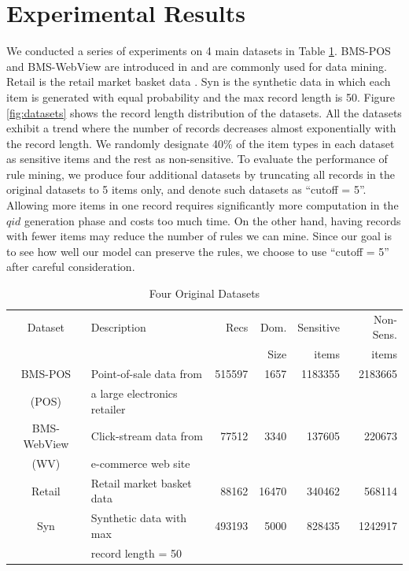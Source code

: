 \section{Experimental Results}
\label{sec:eval}

We conducted a series of experiments on
4 main datasets in Table \ref{tab:datasets}. BMS-POS and BMS-WebView are
introduced in \cite{Zheng:2001:RWP:502512.502572} and are commonly used for
data mining. Retail is the retail market basket data \cite{brijs99:retailData}. Syn is the synthetic data in which each item is generated with
equal probability and the max record length is 50.
%
Figure \ref{fig:datasets} shows the record length distribution of the datasets.
All the datasets exhibit a trend where the number of records decreases almost exponentially
with the record length.
%
We randomly designate 40\% of the item types in each dataset as
sensitive items and the rest as non-sensitive.
%
To evaluate the performance of rule mining,
we produce four additional datasets by truncating all records in the
original datasets to 5 items only, and denote
such datasets as ``cutoff = 5''.
Allowing more items in one record requires significantly more computation in the $qid$ 
generation phase and costs too much time. On the other hand,
having records with fewer items may reduce the number of rules we can mine.
Since our goal is to see how well our model can preserve the rules, 
we choose to use ``cutoff = 5'' after careful consideration.

\begin{table}[tb]
\centering
\caption{Four Original Datasets\label{tab:datasets}}{
\begin{tabular}{|c|l|r|r|r|r|} \hline
Dataset	& Description & Recs & Dom. & Sensitive & Non-Sens.\\
& & & Size & items & items  \\ \hline \hline
BMS-POS &Point-of-sale data from &515597 & 1657&1183355 &  2183665\\
(POS)	& a large electronics retailer   &	&	&	& \\ \hline
BMS-WebView &Click-stream data from &77512 & 3340& 137605 & 220673  \\
(WV) & e-commerce web site  & &  & & \\ \hline
Retail &  Retail market basket data   & 88162&16470 &340462 & 568114  \\ \hline
Syn & Synthetic data with max & 493193 &5000 &828435 & 1242917 \\
 & record length = 50   & & & & \\ \hline
\end{tabular}
}
\end{table}

